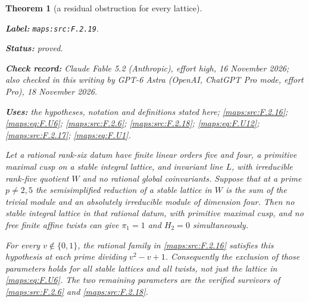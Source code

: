\documentclass[11pt,a4paper]{article}
\newtheorem{theorem}{Theorem}[section]
\theoremstyle{definition}
\newcommand{\StatementRecord}[4]{\par\smallskip\begingroup\upshape\raggedright\noindent\textbf{Label:} \nolinkurl{#1}.\par\noindent\textbf{Status:} #2.\par\noindent\textbf{Check record:} #3.\par\noindent\textbf{Uses:} #4.\par\endgroup\smallskip}
\newcommand{\CurrentChecker}{GPT-6 Astra (OpenAI, ChatGPT Pro mode, effort Pro), 18 November 2026}
\begin{document}
\begin{theorem}[a residual obstruction for every lattice]\label{maps:src:F.2.19}
\StatementRecord{maps:src:F.2.19}{proved}{Claude Fable 5.2 (Anthropic), effort high, 16 November 2026; also checked in this writing by \CurrentChecker}{the hypotheses, notation and definitions stated here; \cref{maps:src:F.2.16}; \cref{maps:eq:F.U6}; \cref{maps:src:F.2.6}; \cref{maps:src:F.2.18}; \cref{maps:eq:F.U12}; \cref{maps:src:F.2.17}; \cref{maps:eq:F.U1}}


Let a rational rank-six datum have finite linear orders five
and four, a primitive maximal cusp on a stable integral lattice,
and invariant line $L$, with irreducible rank-five quotient $W$
and no rational global coinvariants.  Suppose that at a prime
$p\ne2,5$ the semisimplified reduction of a stable lattice in
$W$ is the sum of the trivial module and an absolutely
irreducible module of dimension four.  Then no stable integral
lattice in that rational datum, with primitive maximal cusp,
and no free finite affine twists can give
$\pi_1=1$ and $H_2=0$ simultaneously.

For every $v\notin\{0,1\}$, the rational family in \ref{maps:src:F.2.16}
satisfies this hypothesis at each prime dividing
$v^2-v+1$.  Consequently the exclusion of those parameters
holds for \emph{all} stable lattices and all twists, not just
the lattice in \eqref{maps:eq:F.U6}.  The two remaining parameters are the
verified survivors of \ref{maps:src:F.2.6} and \ref{maps:src:F.2.18}.

\end{theorem}
\end{document}
